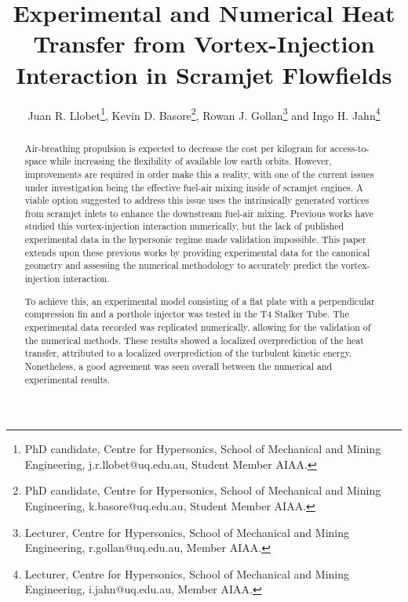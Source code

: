 \documentclass{AIAA}
\begin{document}
\title{Experimental and Numerical Heat Transfer from Vortex-Injection Interaction in Scramjet Flowfields}

\author{Juan R. Llobet\footnote{PhD candidate, Centre for Hypersonics, School of Mechanical and Mining Engineering, j.r.llobet@uq.edu.au, Student Member AIAA.}, Kevin D. Basore\footnote{PhD candidate, Centre for Hypersonics, School of Mechanical and Mining Engineering, k.basore@uq.edu.au, Student Member AIAA.}, Rowan J. Gollan\footnote{Lecturer, Centre for Hypersonics, School of Mechanical and Mining Engineering, r.gollan@uq.edu.au, Member AIAA.} and Ingo H. Jahn\footnote{Lecturer, Centre for Hypersonics, School of Mechanical and Mining Engineering, i.jahn@uq.edu.au, Member AIAA.}}

\begin{abstract}

Air-breathing propulsion is expected to decrease the cost per kilogram for access-to-space while increasing the flexibility of available low earth orbits.
However, improvements are required in order make this a reality, with one of the current issues under investigation being the effective fuel-air mixing inside of scramjet engines.
A viable option suggested to address this issue uses the intrinsically generated vortices from scramjet inlets to enhance the downstream fuel-air mixing.
Previous works have studied this vortex-injection interaction numerically, but the lack of published experimental data in the hypersonic regime made validation impossible.
This paper extends upon these previous works by providing experimental data for the canonical geometry and assessing the numerical methodology to accurately predict the vortex-injection interaction.

To achieve this, an experimental model consisting of a flat plate with a perpendicular compression fin and a porthole injector was tested in the T4 Stalker Tube.
The experimental data recorded was replicated numerically, allowing for the validation of the numerical methods.
These results showed a localized overprediction of the heat transfer, attributed to a localized overprediction of the turbulent kinetic energy.
Nonetheless, a good agreement was seen overall between the numerical and experimental results. 


\end{abstract}
\end{document}
